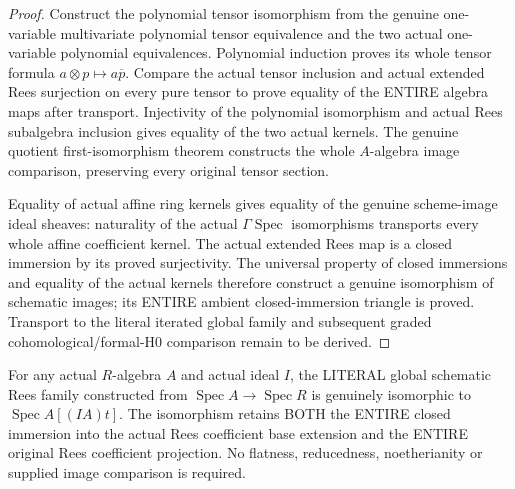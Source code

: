 \begin{proof}
Construct the polynomial tensor isomorphism from the genuine one-variable multivariate
polynomial tensor equivalence and the two actual one-variable polynomial equivalences.
Polynomial induction proves its whole tensor formula $a\otimes p\mapsto a\overline p$.
Compare the actual tensor inclusion and actual extended Rees surjection on every pure
tensor to prove equality of the ENTIRE algebra maps after transport. Injectivity of the
polynomial isomorphism and actual Rees subalgebra inclusion gives equality of the two actual
kernels. The genuine quotient first-isomorphism theorem constructs the whole $A$-algebra
image comparison, preserving every original tensor section.

Equality of actual affine ring kernels gives equality of the genuine scheme-image ideal
sheaves: naturality of the actual $\Gamma\operatorname{Spec}$ isomorphisms transports every
whole affine coefficient kernel. The actual extended Rees map is a closed immersion by
its proved surjectivity. The universal property of closed immersions and equality of the
actual kernels therefore construct a genuine isomorphism of schematic images; its ENTIRE
ambient closed-immersion triangle is proved. Transport to the literal iterated global family
and subsequent graded cohomological/formal-H0 comparison remain to be derived.
\end{proof}

\begin{lemma}\label{lem:fc-rees-formal-affine-scheme}
\leanok
{}
For any actual $R$-algebra $A$ and actual ideal $I$, the LITERAL global schematic Rees family
constructed from $\operatorname{Spec}A\to\operatorname{Spec}R$ is genuinely isomorphic to
$\operatorname{Spec}A[(IA)t]$. The isomorphism retains BOTH the ENTIRE closed immersion into
the actual Rees coefficient base extension and the ENTIRE original Rees coefficient projection.
No flatness, reducedness, noetherianity or supplied image comparison is required.
\end{lemma}

